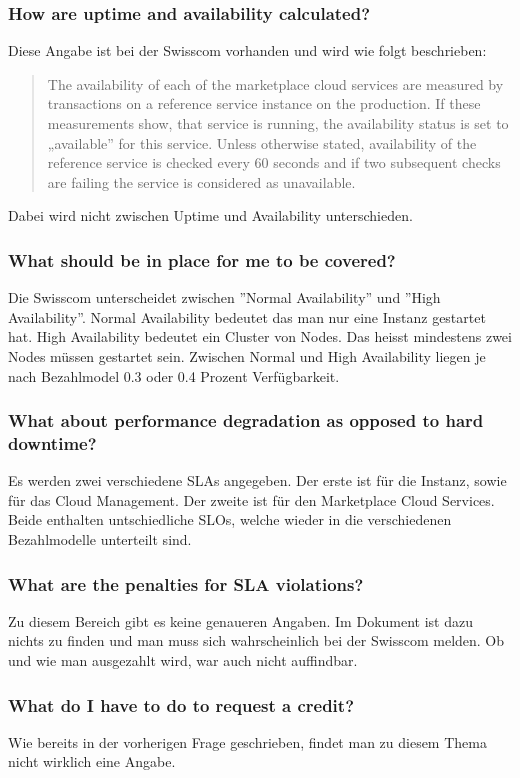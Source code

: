 \subsubsection{How are uptime and availability calculated?}
Diese Angabe ist bei der Swisscom vorhanden und wird wie folgt beschrieben:
\begin{quote}
The availability of each of the marketplace cloud services are measured by transactions on a reference service
instance on the production. If these measurements show, that service is running, the availability status
is set to „available” for this service. Unless otherwise stated, availability of the reference service is
checked every 60 seconds and if two subsequent checks are failing the service is considered as unavailable.
\end{quote}
Dabei wird nicht zwischen Uptime und Availability unterschieden.
\subsubsection{What should be in place for me to be covered?}
Die Swisscom unterscheidet zwischen ''Normal Availability'' und ''High Availability''. Normal Availability bedeutet das man nur eine Instanz gestartet hat. High Availability bedeutet ein Cluster von Nodes. Das heisst mindestens zwei Nodes müssen gestartet sein. Zwischen Normal und High Availability liegen je nach Bezahlmodel 0.3 oder 0.4 Prozent Verfügbarkeit.
\subsubsection{What about performance degradation as opposed to hard downtime?}
Es werden zwei verschiedene SLAs angegeben. Der erste ist für die Instanz, sowie für das Cloud Management. Der zweite ist für den Marketplace Cloud Services. Beide enthalten untschiedliche SLOs, welche wieder in die verschiedenen Bezahlmodelle unterteilt sind.
\subsubsection{What are the penalties for SLA violations?}
Zu diesem Bereich gibt es keine genaueren Angaben. Im Dokument ist dazu nichts zu finden und man muss sich wahrscheinlich bei der Swisscom melden. Ob und wie man ausgezahlt wird, war auch nicht auffindbar.
\subsubsection{What do I have to do to request a credit?}
Wie bereits in der vorherigen Frage geschrieben, findet man zu diesem Thema nicht wirklich eine Angabe.
